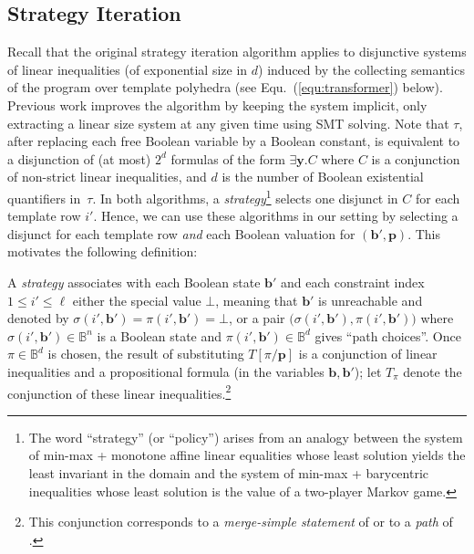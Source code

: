 \documentclass{llncs}
\newcommand{\pponly}[1]{}
\newcommand{\rronly}[1]{#1}
\newcommand{\BB}{\mathbb{B}}
\newcommand{\sleq}{\!\leq\!}
\renewcommand{\vec}[1]{{\boldsymbol #1}}
\begin{document}
\subsection{Strategy Iteration}
\label{sec:original_strategy_iteration}
Recall that the original strategy iteration algorithm \cite{GS07}
applies to disjunctive systems of linear inequalities (of exponential
size in $d$) induced by the collecting semantics of the program over
template polyhedra (see Equ.~(\ref{equ:transformer}) below).
Previous work \cite{Gawlitza_Monniaux_LMCS12} improves the algorithm by keeping
 the system implicit, only extracting a linear size system at any
 given time using SMT solving.
Note that $\tau$, after replacing each free Boolean variable by a
Boolean constant, is equivalent to a disjunction of (at most) $2^d$
formulas of the form $\exists \vec{y}.C$ where $C$ is a
conjunction of non-strict linear inequalities, and $d$ is the number
of Boolean existential quantifiers in~$\tau$.
In both algorithms, a \emph{strategy}\rronly{\footnote{The word ``strategy'' (or ``policy'') arises from an
    analogy between the system of min-max + monotone affine linear
    equalities whose least solution yields the least invariant in the
    domain \cite{Gawlitza_Monniaux_LMCS12,GS07} and the system of
    min-max + barycentric inequalities whose least solution is the
    value of a two-player Markov game.}}  
selects one disjunct in $C$ for each template row $i'$.  
Hence, we can use these algorithms in our setting by selecting a
disjunct for each template row \emph{and} each Boolean valuation for
$(\vec{b'},\vec{p})$.  This motivates the following definition:

A \emph{strategy} associates with each Boolean state $\vec{b}'$
and each constraint index $1 \sleq i' \sleq \ell$ either the special
value $\bot$, meaning that $\vec{b}'$ is unreachable and denoted by
$\sigma(i',\vec{b}')=\pi(i',\vec{b}')=\bot$, or a pair
$\big(\sigma(i',\vec{b}'),\pi(i',\vec{b}') \big)$ where
$\sigma(i',\vec{b}') \in \BB^n$ is a Boolean state and
$\pi(i',\vec{b}') \in \BB^d$ gives ``path choices''.  Once $\pi \in
\BB^d$ is chosen, the result of substituting $T[\pi/\vec{p}]$ is a
conjunction of linear inequalities and a propositional formula (in
the variables $\vec{b},\vec{b}'$); let
$T_\pi$ denote the conjunction of these linear inequalities.\pponly{\\[-3ex]}\rronly{\footnote{This conjunction corresponds to a \emph{merge-simple
    statement} of \cite{Gawlitza_Monniaux_LMCS12} or to a \emph{path}
  of \cite{Henry_Monniaux_Moy_SAS2012,Monniaux_Gonnord_SAS11}.}}
\end{document}
